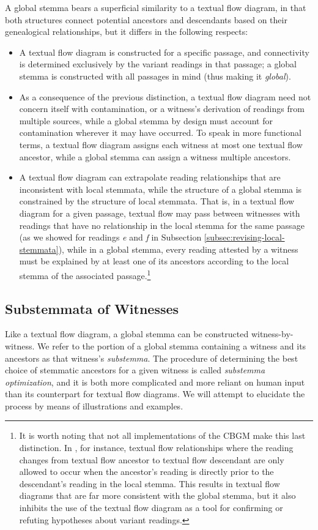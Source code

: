 \documentclass[a4paper, 12pt]{article}
\begin{document}
	A global stemma bears a superficial similarity to a textual flow diagram, in that both structures connect potential ancestors and descendants based on their genealogical relationships, but it differs in the following respects:
	\begin{itemize}
		\item A textual flow diagram is constructed for a specific passage, and connectivity is determined exclusively by the variant readings in that passage; a global stemma is constructed with all passages in mind (thus making it \emph{global}).
		\item As a consequence of the previous distinction, a textual flow diagram need not concern itself with contamination, or a witness's derivation of readings from multiple sources, while a global stemma by design must account for contamination wherever it may have occurred. To speak in more functional terms, a textual flow diagram assigns each witness at most one textual flow ancestor, while a global stemma can assign a witness multiple ancestors.
		\item A textual flow diagram can extrapolate reading relationships that are inconsistent with local stemmata, while the structure of a global stemma is constrained by the structure of local stemmata. That is, in a textual flow diagram for a given passage, textual flow may pass between witnesses with readings that have no relationship in the local stemma for the same passage (as we showed for readings \emph{e} and \emph{f} in Subsection \ref{subsec:revising-local-stemmata}), while in a global stemma, every reading attested by a witness must be explained by at least one of its ancestors according to the local stemma of the associated passage.\footnote{It is worth noting that not all implementations of the CBGM make this last distinction. In \cite{Edmondson19}, for instance, textual flow relationships where the reading changes from textual flow ancestor to textual flow descendant are only allowed to occur when the ancestor's reading is directly prior to the descendant's reading in the local stemma. This results in textual flow diagrams that are far more consistent with the global stemma, but it also inhibits the use of the textual flow diagram as a tool for confirming or refuting hypotheses about variant readings.}
	\end{itemize}
	
	\newpage
	
	\subsection{Substemmata of Witnesses}\label{subsec:substemmata}
	Like a textual flow diagram, a global stemma can be constructed witness-by-witness. We refer to the portion of a global stemma containing a witness and its ancestors as that witness's \emph{substemma}. The procedure of determining the best choice of stemmatic ancestors for a given witness is called \emph{substemma optimization}, and it is both more complicated and more reliant on human input than its counterpart for textual flow diagrams. We will attempt to elucidate the process by means of illustrations and examples.
	
\end{document}
